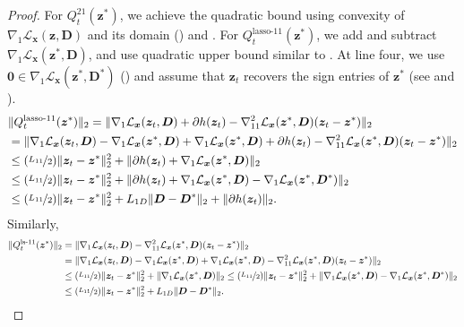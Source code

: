\documentclass[10pt]{article} %
\newcommand{\D}{{\bm D}}
\newcommand{\x}{{\bm x}}
\newcommand{\z}{{\bm z}}
\newcommand{\zero}{{\bm 0}}
\newcommand{\Loss}{\mathcal{L}}
\begin{document}
%
\begin{proof}
For $Q_t^{21}(\z^{\ast})$, we achieve the quadratic bound using convexity of $\nabla_1 \Loss_{\x}(\z, \D)$ and its domain () and . For $Q_t^{\text{lasso-}11}(\z^{\ast})$, we add and subtract $\nabla_1\Loss_{\x}(\z^{\ast}, \D)$, and use quadratic upper bound similar to . At line four, we use $\zero \in \nabla_1 \Loss_{\x}(\z^{\ast}, \D^{\ast})$ () and assume that $\z_t$ recovers the sign entries of $\z^{\ast}$ (see  and ).
%
\begin{equation}
\begin{aligned}
&\| Q_t^{\text{lasso-}11}(\z^{\ast}) \|_2 = \| \nabla_1 \Loss_{\x}(\z_t, \D) + \partial h(\z_t) - \nabla_{11}^2\Loss_{\x}(\z^{\ast}, \D) (\z_t - \z^{\ast}) \|_2\\
&= \| \nabla_1 \Loss_{\x}(\z_t, \D) - \nabla_1\Loss_{\x}(\z^{\ast}, \D)  + \nabla_1\Loss_{\x}(\z^{\ast}, \D) + \partial h(\z_t) - \nabla_{11}^2\Loss_{\x}(\z^{\ast}, \D) (\z_t - \z^{\ast}) \|_2\\
&\leq (\nicefrac{L_{11}}{2}) \| \z_t - \z^{\ast} \|_2^2 + \| \partial h(\z_t) + \nabla_1\Loss_{\x}(\z^{\ast}, \D) \|_2\\
&\leq (\nicefrac{L_{11}}{2}) \| \z_t - \z^{\ast} \|_2^2 + \| \partial h(\z_t) + \nabla_1\Loss_{\x}(\z^{\ast}, \D) - \nabla_1\Loss_{\x}(\z^{\ast}, \D^{\ast})\|_2\\
&\leq (\nicefrac{L_{11}}{2}) \| \z_t - \z^{\ast} \|_2^2 + L_{1D} \| \D - \D^{\ast} \|_2 + \| \partial h(\z_t) \|_2.
\end{aligned}
\end{equation}
%
Similarly,
\begin{equation}
\begin{aligned}
\| Q_t^{\text{ls-}11}(\z^{\ast}) \|_2 &= \| \nabla_1 \Loss_{\x}(\z_t, \D) - \nabla_{11}^2\Loss_{\x}(\z^{\ast}, \D) (\z_t - \z^{\ast}) \|_2\\
&= \| \nabla_1 \Loss_{\x}(\z_t, \D) - \nabla_1\Loss_{\x}(\z^{\ast}, \D)  + \nabla_1\Loss_{\x}(\z^{\ast}, \D) - \nabla_{11}^2\Loss_{\x}(\z^{\ast}, \D) (\z_t - \z^{\ast}) \|_2\\
&\leq (\nicefrac{L_{11}}{2}) \| \z_t - \z^{\ast} \|_2^2 + \| \nabla_1\Loss_{\x}(\z^{\ast}, \D) \|_2
\leq (\nicefrac{L_{11}}{2}) \| \z_t - \z^{\ast} \|_2^2 + \| \nabla_1\Loss_{\x}(\z^{\ast}, \D) - \nabla_1\Loss_{\x}(\z^{\ast}, \D^{\ast})\|_2\\
&\leq (\nicefrac{L_{11}}{2}) \| \z_t - \z^{\ast} \|_2^2 + L_{1D} \| \D - \D^{\ast} \|_2.

\end{aligned}
\end{equation}
\end{proof}
\end{document}
